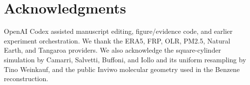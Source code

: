 \documentclass[review]{vgtc}                 %
\begin{document}
\maketitle
\raggedbottom
\setlength{\emergencystretch}{1em}








\FloatBarrier





\FloatBarrier



\FloatBarrier


\section*{Acknowledgments}
OpenAI Codex assisted manuscript editing, figure/evidence code, and earlier experiment orchestration. We thank the ERA5, FRP, OLR, PM2.5, Natural Earth, and Tangaroa providers. We also acknowledge the square-cylinder simulation by Camarri, Salvetti, Buffoni, and Iollo and its uniform resampling by Tino Weinkauf, and the public Inviwo molecular geometry used in the Benzene reconstruction.
\begingroup
{}
\setlength{\bibspacing}{-0.3pt}


\endgroup
\end{document}

